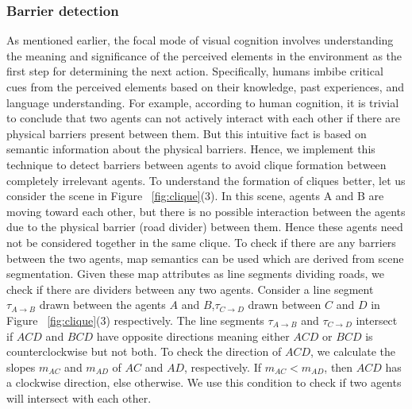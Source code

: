\documentclass{article}
\begin{document}
\subsubsection{Barrier detection}
As mentioned earlier, the focal mode of visual cognition involves understanding the meaning and significance of the perceived elements in the environment as the first step for determining the next action. Specifically, humans imbibe critical cues from the perceived elements based on their knowledge, past experiences, and language understanding. For example, according to human cognition, it is trivial to conclude that two agents can not actively interact with each other if there are physical barriers present between them. But this intuitive fact is based on semantic information about the physical barriers. Hence, we implement this technique to detect barriers between agents to avoid clique formation between completely irrelevant agents. 
To understand the formation of cliques better, let us consider the scene in Figure ~\ref{fig:clique}(3).
In this scene, agents A and B are moving toward each other, but there is no possible interaction between the agents due to the physical barrier (road divider) between them. Hence these agents need not be considered together  in the same clique.  To check if there are any barriers between the two agents, map semantics can be used which are derived from scene segmentation. Given these map attributes as line segments dividing roads, we check if there are dividers between any two agents. Consider a line segment $\tau_{A \rightarrow{B}}$ drawn between the agents $A$ and $B$,$\tau_{C \rightarrow D}$ drawn between $C$ and $D$ in Figure ~\ref{fig:clique}(3) respectively. The line segments $\tau_{A \rightarrow{B}}$ and $\tau_{C\rightarrow D}$ intersect if $ACD$ and $BCD$ have opposite directions meaning either $ACD$ or $BCD$ is counterclockwise but not both. To check the direction of $ACD$, we calculate the slopes $m_{AC}$ and $m_{AD}$ of $AC$ and $AD$, respectively.  If $m_{AC} < m_{AD}$, then $ACD$ has a clockwise direction, else otherwise. We use this condition to check %
if two agents will intersect with each other.
\end{document}
